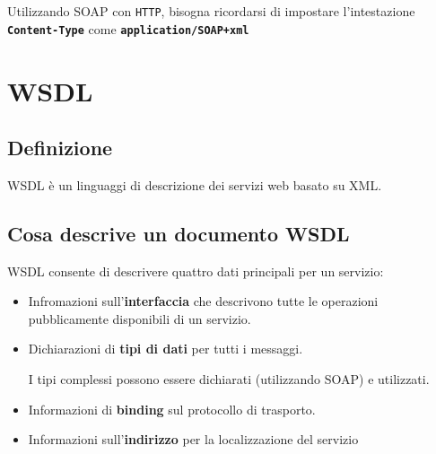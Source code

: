 Utilizzando SOAP con \texttt{HTTP}, bisogna ricordarsi di impostare l'intestazione \textbf{\texttt{Content-Type}} come \textbf{\texttt{application/SOAP+xml}} 

\section{WSDL}
\subsection{Definizione}
WSDL è un linguaggi di descrizione dei servizi web basato su XML.

\subsection{Cosa descrive un documento WSDL}
WSDL consente di descrivere quattro dati principali per un servizio:
\begin{itemize}
    \item Infromazioni sull'\textbf{interfaccia} che descrivono tutte le operazioni pubblicamente disponibili di un servizio.
    \item Dichiarazioni di \textbf{tipi di dati} per tutti i messaggi.

    I tipi complessi possono essere dichiarati (utilizzando SOAP) e utilizzati.
    \item Informazioni di \textbf{binding} sul protocollo di trasporto.
    \item Informazioni sull'\textbf{indirizzo} per la localizzazione del servizio
\end{itemize}

